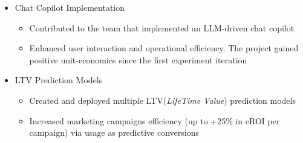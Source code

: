 \documentclass[a4paper,12pt]{memoir} %
\begin{document}
{\begin{itemize}
\begin{itemize}
		\item Boosted conversion rates by 15\%
	\end{itemize}
	\item Chat Copilot Implementation
	\begin{itemize}
		\item Contributed to the team that implemented an LLM-driven chat copilot
		\item Enhanced user interaction and operational efficiency. The project gained positive unit-economics since the first experiment iteration
	\end{itemize}
	\item LTV Prediction Models
	\begin{itemize}
		\item Created and deployed multiple LTV(\textit{LifeTime Value}) prediction models
		\item Increased marketing campaigns efficiency (up to +25\% in eROI per campaign)
			via usage as predictive conversions
	\end{itemize}
\end{itemize}
}


\Sep %



\clearpage %

\userinformation %

\framebreak %

\end{document}
